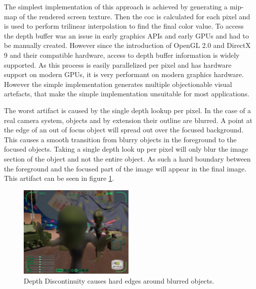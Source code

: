 The simplest implementation of this approach is achieved by generating a mip-map of the rendered screen texture.
Then the \gls{coc} is calculated for each pixel and is used to perform trilinear interpolation to find the final color value.
To access the depth buffer was an issue in early graphics APIs and early GPUs and had to be manually created.
However since the introduction of OpenGL 2.0 and DirectX 9 and their compatible hardware, access to depth buffer information is widely supported.
As this process is easily parallelized per pixel and has hardware support on modern GPUs, it is very performant on modern graphics hardware.
However the simple implementation generates multiple objectionable visual artefacts, that make the simple implementation unsuitable for most applications.\cite{Demers.2005, Hammon.2008}

The worst artifact is caused by the single depth lookup per pixel.
In the case of a real camera system, objects and by extension their outline are blurred.
A point at the edge of an out of focus object will spread out over the focused background.
This causes a smooth transition from blurry objects in the foreground to the focused objects.
Taking a single depth look up per pixel will only blur the image section of the object and not the entire object.
As such a hard boundary between the foreground and the focused part of the image will appear in the final image.
This artifact can be seen in figure \ref{fig:depth-discontinuity}.\cite{Demers.2005}


\begin{figure}[h]
    \centering
    \includegraphics[width=0.5\textwidth]{images/depth-discontinuity.jpg}
    \caption{Depth Discontinuity causes hard edges around blurred objects. \cite{Demers.2005}}
    \label{fig:depth-discontinuity}
\end{figure}

